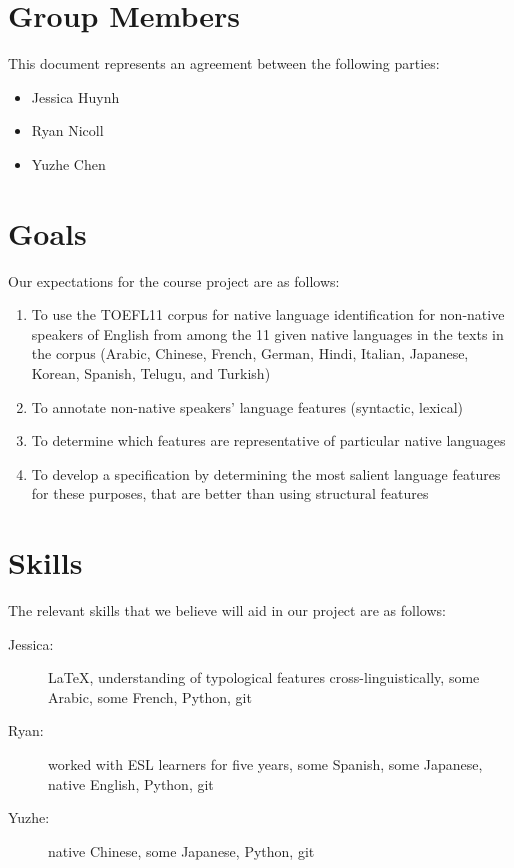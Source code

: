 \documentclass{article}
\newcommand{\groupmember}[1]{#1}
\begin{document}
\section{Group Members} %
\label{par:group_members}
This document represents an agreement between the following parties:
\begin{itemize}
    \item \groupmember{Jessica Huynh}
    \item \groupmember{Ryan Nicoll}
    \item \groupmember{Yuzhe Chen}
\end{itemize}

\section{Goals} %
\label{par:expectations}
Our expectations for the course project are as follows:
\begin{enumerate}
    \item To use the TOEFL11 corpus for native language identification for non-native speakers of English from among the 11 given native languages in the texts in the corpus (Arabic, Chinese, French, German, Hindi, Italian, Japanese, Korean, Spanish, Telugu, and Turkish)
    \item To annotate non-native speakers' language features (syntactic, lexical)
    \item To determine which features are representative of particular native languages
    \item To develop a specification by determining the most salient language features for these purposes, that are better than using structural features
\end{enumerate}

\section{Skills} %
\label{sec:skills}

The relevant skills that we believe will aid in our project are as follows:

\begin{description}
    \item[\groupmember{Jessica}:] \LaTeX, understanding of typological features cross-linguistically, some Arabic, some French, Python, git
    \item[\groupmember{Ryan}:] worked with ESL learners for five years, some Spanish, some Japanese, native English, Python, git
    \item[\groupmember{Yuzhe}:] native Chinese, some Japanese, Python, git
\end{description}
\end{document}
